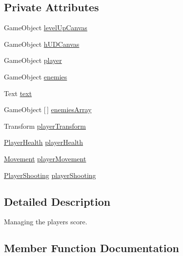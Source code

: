 \subsection*{Private Attributes}
\begin{DoxyCompactItemize}
\item 
Game\+Object \mbox{\hyperlink{class_score_manager_a41afe94490f4a738433f9dcdf5eed209}{level\+Up\+Canvas}}
\item 
Game\+Object \mbox{\hyperlink{class_score_manager_afb75e6f7955d82956ecc767c8ec186cb}{h\+U\+D\+Canvas}}
\item 
Game\+Object \mbox{\hyperlink{class_score_manager_a3959e78e166cf4680f6742802cbfb931}{player}}
\item 
Game\+Object \mbox{\hyperlink{class_score_manager_a623170e953f0840f70797d12148dd34f}{enemies}}
\item 
Text \mbox{\hyperlink{class_score_manager_a7ef05edbcfef0503c0e0cc501e71e95e}{text}}
\item 
Game\+Object \mbox{[}$\,$\mbox{]} \mbox{\hyperlink{class_score_manager_aa925a706b20737ee0706320bfedf870d}{enemies\+Array}}
\item 
Transform \mbox{\hyperlink{class_score_manager_afa29eba71bb311c9f305a0ab185a1981}{player\+Transform}}
\item 
\mbox{\hyperlink{class_player_health}{Player\+Health}} \mbox{\hyperlink{class_score_manager_a733e4d30eccc81a124a3602a5e97d964}{player\+Health}}
\item 
\mbox{\hyperlink{class_movement}{Movement}} \mbox{\hyperlink{class_score_manager_a3ab7ebfe8586d869b79eb6d8ebad99a8}{player\+Movement}}
\item 
\mbox{\hyperlink{class_player_shooting}{Player\+Shooting}} \mbox{\hyperlink{class_score_manager_a97abd926be72530ac0c4250271e7ad1f}{player\+Shooting}}
\end{DoxyCompactItemize}


\subsection{Detailed Description}
Managing the player\textquotesingle{}s score. 

\subsection{Member Function Documentation}
\mbox{\label{class_score_manager_a68b661eece0b6102ad825d88990a83f8}} 
